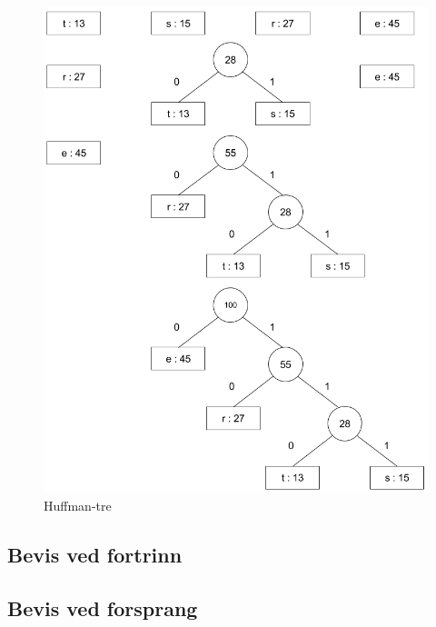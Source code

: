 \begin{boxed}
\begin{figure}[H]
\includegraphics[scale=0.47]{images/huffman}
\centering %
\caption{Huffman-tre}
\label{fig:huffman}
\end{figure}
\end{boxed}

\subsection{Bevis ved fortrinn}
\subsection{Bevis ved forsprang}